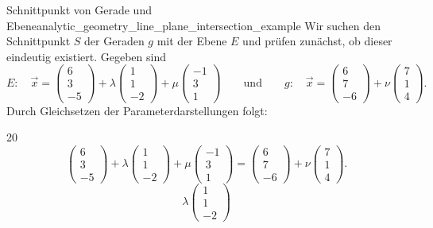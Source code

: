 \begin{ExampleBox}{Schnittpunkt von Gerade und Ebene}{analytic_geometry_line_plane_intersection_example}
  Wir suchen den Schnittpunkt $S$ der Geraden $g$ mit der Ebene $E$ und prüfen
  zunächst, ob dieser eindeutig existiert. Gegeben sind
  \[
    E:\quad
    \vec x=\begin{pmatrix}6\\3\\-5\end{pmatrix}
      +\lambda\begin{pmatrix}1\\1\\-2\end{pmatrix}
      +\mu\begin{pmatrix}-1\\3\\1\end{pmatrix}
    \qquad\text{und}\qquad
    g:\quad
    \vec x=\begin{pmatrix}6\\7\\-6\end{pmatrix}
      +\nu\begin{pmatrix}7\\1\\4\end{pmatrix}.
  \]
  Durch Gleichsetzen der Parameterdarstellungen folgt:
  \begin{ClozeArea}[34]{20}
    \[
      \begin{pmatrix}6\\3\\-5\end{pmatrix}
        +\lambda\begin{pmatrix}1\\1\\-2\end{pmatrix}
        +\mu\begin{pmatrix}-1\\3\\1\end{pmatrix}
      =\begin{pmatrix}6\\7\\-6\end{pmatrix}
        +\nu\begin{pmatrix}7\\1\\4\end{pmatrix}.
    \]
    \[
      \lambda\begin{pmatrix}1\\1\\-2\end{pmatrix}
\]
\end{ClozeArea}
\end{ExampleBox}
